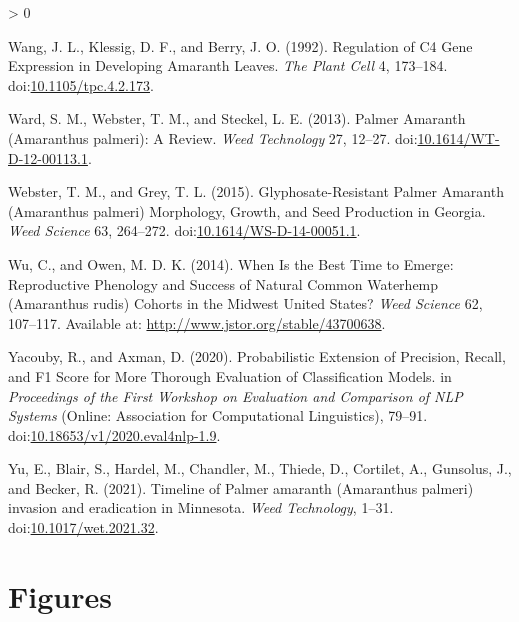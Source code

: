 \documentclass[utf8]{frontiersSCNS}
\newlength{\cslhangindent}
\newenvironment{CSLReferences}[2] %
 {%
  \setlength{\parindent}{0pt}
  \ifodd #1 \everypar{\setlength{\hangindent}{\cslhangindent}}\ignorespaces\fi
  \ifnum #2 > 0
  \setlength{\parskip}{#2\baselineskip}
  \fi
 }%
 {}
\begin{document}
\begin{CSLReferences}{1}{0}
\leavevmode\hypertarget{ref-wang1992}{}%
Wang, J. L., Klessig, D. F., and Berry, J. O. (1992). Regulation of {C4
Gene Expression} in {Developing Amaranth Leaves}. \emph{The Plant Cell}
4, 173--184.
doi:\href{https://doi.org/10.1105/tpc.4.2.173}{10.1105/tpc.4.2.173}.

\leavevmode\hypertarget{ref-ward2013}{}%
Ward, S. M., Webster, T. M., and Steckel, L. E. (2013). Palmer
{Amaranth} ({Amaranthus} palmeri): {A Review}. \emph{Weed Technology}
27, 12--27.
doi:\href{https://doi.org/10.1614/WT-D-12-00113.1}{10.1614/WT-D-12-00113.1}.

\leavevmode\hypertarget{ref-webster2015}{}%
Webster, T. M., and Grey, T. L. (2015). Glyphosate-{Resistant Palmer
Amaranth} ({Amaranthus} palmeri) {Morphology}, {Growth}, and {Seed
Production} in {Georgia}. \emph{Weed Science} 63, 264--272.
doi:\href{https://doi.org/10.1614/WS-D-14-00051.1}{10.1614/WS-D-14-00051.1}.

\leavevmode\hypertarget{ref-wu2014}{}%
Wu, C., and Owen, M. D. K. (2014). When {Is} the {Best Time} to
{Emerge}: {Reproductive Phenology} and {Success} of {Natural Common
Waterhemp} ({Amaranthus} rudis) {Cohorts} in the {Midwest United
States}? \emph{Weed Science} 62, 107--117. Available at:
\url{http://www.jstor.org/stable/43700638}.

\leavevmode\hypertarget{ref-yacouby2020}{}%
Yacouby, R., and Axman, D. (2020). Probabilistic {Extension} of
{Precision}, {Recall}, and {F1 Score} for {More Thorough Evaluation} of
{Classification Models}. in \emph{Proceedings of the {First Workshop} on
{Evaluation} and {Comparison} of {NLP Systems}} ({Online}: {Association
for Computational Linguistics}), 79--91.
doi:\href{https://doi.org/10.18653/v1/2020.eval4nlp-1.9}{10.18653/v1/2020.eval4nlp-1.9}.

\leavevmode\hypertarget{ref-yu2021}{}%
Yu, E., Blair, S., Hardel, M., Chandler, M., Thiede, D., Cortilet, A.,
Gunsolus, J., and Becker, R. (2021). Timeline of {Palmer} amaranth
({Amaranthus} palmeri) invasion and eradication in {Minnesota}.
\emph{Weed Technology}, 1--31.
doi:\href{https://doi.org/10.1017/wet.2021.32}{10.1017/wet.2021.32}.

\end{CSLReferences}

\newpage

\hypertarget{figures}{%
\section*{Figures}\label{figures}}
\end{document}
